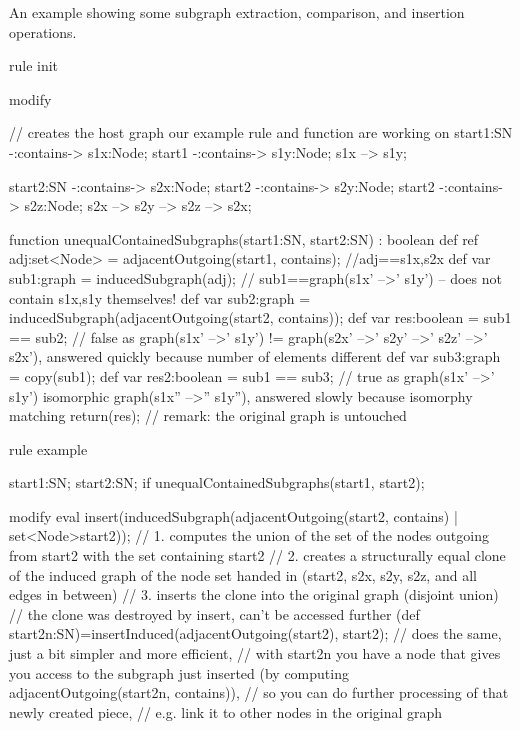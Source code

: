 \begin{example}
An example showing some subgraph extraction, comparison, and insertion operations.
\begin{grgen}
rule init
{
	modify { // creates the host graph our example rule and function are working on
		start1:SN -:contains-> s1x:Node;
		start1    -:contains-> s1y:Node;
		s1x --> s1y;

		start2:SN -:contains-> s2x:Node;
		start2    -:contains-> s2y:Node;
		start2    -:contains-> s2z:Node;
		s2x --> s2y --> s2z --> s2x;
	}
}

function unequalContainedSubgraphs(start1:SN, start2:SN) : boolean
{
	def ref adj:set<Node> = adjacentOutgoing(start1, contains); //adj=={s1x,s2x}
	def var sub1:graph = inducedSubgraph(adj); // sub1==graph(s1x' -->' s1y') -- does not contain s1x,s1y themselves!
	def var sub2:graph = inducedSubgraph(adjacentOutgoing(start2, contains));
	def var res:boolean = sub1 == sub2; // false as graph(s1x' -->' s1y') != graph(s2x' -->' s2y' -->' s2z' -->' s2x'), answered quickly because number of elements different
	def var sub3:graph = copy(sub1);
	def var res2:boolean = sub1 == sub3; // true as graph(s1x' -->' s1y') isomorphic graph(s1x'' -->'' s1y''), answered slowly because isomorphy matching
	return(res); // remark: the original graph is untouched
}

rule example
{
	start1:SN; start2:SN;
	if{ unequalContainedSubgraphs(start1, start2); }
	
	modify {
		eval {
			insert(inducedSubgraph(adjacentOutgoing(start2, contains) | set<Node>{start2}));
				// 1. computes the union of the set of the nodes outgoing from start2 with the set containing start2
				// 2. creates a structurally equal clone of the induced graph of the node set handed in (start2, s2x, s2y, s2z, and all edges in between)
				// 3. inserts the clone into the original graph (disjoint union)
				// the clone was destroyed by insert, can't be accessed further
			(def start2n:SN)=insertInduced(adjacentOutgoing(start2), start2);
				// does the same, just a bit simpler and more efficient, 
				// with start2n you have a node that gives you access to the subgraph just inserted (by computing adjacentOutgoing(start2n, contains)),
				// so you can do further processing of that newly created piece,
				// e.g. link it to other nodes in the original graph
		}
	}
}
\end{grgen}
\end{example}


